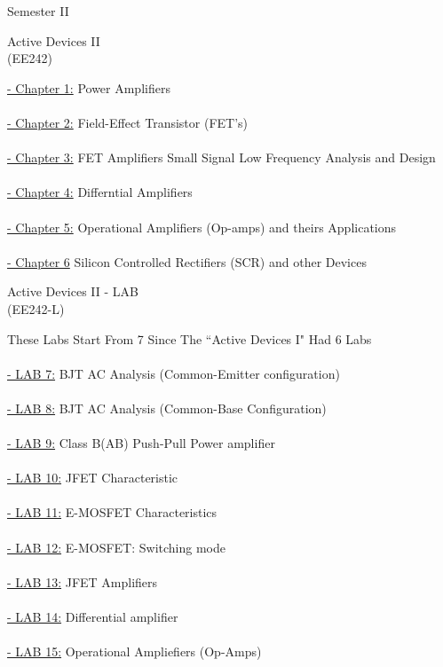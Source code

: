\documentclass[12pt, a4paper]{article}
\begin{document}
 \newpage
\vspace*{\fill}
\begin{center}
    \Huge Semester II %
\end{center}
\vspace*{\fill}

    
\newpage 
\begin{center}
\Huge 
Active Devices II \\ (EE242)
\end{center}
\normalsize
\large \underline{- Chapter 1:} Power Amplifiers \\ \\
\large \underline{- Chapter 2:} Field-Effect Transistor (FET's)\\ \\ 
\large \underline{- Chapter 3:} FET Amplifiers Small Signal Low Frequency Analysis and Design \\ \\ 
\large \underline{- Chapter 4:} Differntial Amplifiers\\ \\
\large \underline{- Chapter 5:} Operational Amplifiers (Op-amps) and theirs Applications \\ \\
\large \underline{- Chapter 6}  Silicon Controlled Rectifiers (SCR) and other Devices




\newpage 
\begin{center}
\Huge 
Active Devices II - LAB  \\ (EE242-L) 
\end{center}
\normalsize
These Labs Start From 7 Since The \textquotedblleft Active Devices I" Had 6 Labs \\ \\ 
\large \underline{- LAB 7:} BJT AC Analysis (Common-Emitter configuration) \\ \\
\large \underline{- LAB 8:} BJT AC Analysis (Common-Base Configuration) \\ \\
\large \underline{- LAB 9:} Class B(AB) Push-Pull Power amplifier \\ \\
\large \underline{- LAB 10:} JFET Characteristic \\ \\
\large \underline{- LAB 11:} E-MOSFET Characteristics \\ \\
\large \underline{- LAB 12:} E-MOSFET: Switching mode \\ \\
\large \underline{- LAB 13:} JFET Amplifiers \\ \\
\large \underline{- LAB 14:} Differential amplifier \\ \\
\large \underline{- LAB 15:} Operational Ampliefiers (Op-Amps) \\ \\
\end{document}
